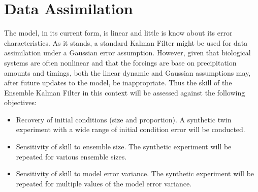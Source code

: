\documentclass[letterpaper]{tufte-handout}
\begin{document}
\section{Data Assimilation}
The model, in its current form, is linear and little is know about its error characteristics. As it stands, a standard Kalman Filter might be used for data assimilation under a Gaussian error assumption. However, given that biological systems are often nonlinear and that the forcings are base on precipitation amounts and timings, both the linear dynamic and Gaussian assumptions may, after future updates to the model, be inappropriate. Thus the skill of the Ensemble Kalman Filter in this context will be assessed against the following objectives:
\begin{itemize}
  \item Recovery of initial conditions (size and proportion). A synthetic twin experiment with a wide range of initial condition error will be conducted.
  \item Sensitivity of skill to ensemble size. The synthetic experiment will be repeated for various ensemble sizes.
  \item Sensitivity of skill to model error variance. The synthetic experiment will be repeated for multiple values of the model error variance.
  \end{itemize}
\end{document}
